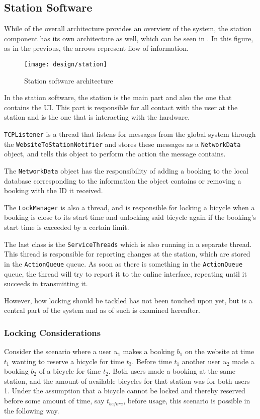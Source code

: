 \subsection{Station Software}\label{subsec:stationsoftdesfgi}
While  of the overall architecture provides an overview of the system, the station component has its own architecture as well, which can be seen in . In this figure, as in the previous, the arrows represent flow of information.

\begin{figure}[h]
	\centering
	\texttt{[image: design/station]}
	\caption{Station software architecture}\label{fig:stationarch}
\end{figure}

In the station software, the station is the main part and also the one that contains the UI. 
This part is responsible for all contact with the user at the station and is the one that is interacting with the hardware.

\texttt{TCPListener} is a thread that listens for messages from the global system through the \texttt{Website\-ToStationNotifier} and stores these messages as a \texttt{NetworkData} object, and tells this object to perform the action the message contains.

The \texttt{NetworkData} object has the responsibility of adding a booking to the local database corresponding to the information the object contains or removing a booking with the ID it received.

The \texttt{LockManager} is also a thread, and is responsible for locking a bicycle when a booking is close to its start time and unlocking said bicycle again if the booking's start time is exceeded by a certain limit.

The last class is the \texttt{ServiceThreads} which is also running in a separate thread.
This thread is responsible for reporting changes at the station, which are stored in the \texttt{ActionQueue} queue.
As soon as there is something in the \texttt{ActionQueue} queue, the thread will try to report it to the online interface, repeating until it succeeds in transmitting it.

However, how locking should be tackled has not been touched upon yet, but is a  central part of the system and as of such is examined hereafter.

\subsubsection{Locking Considerations}\label{subsec:lockingcons}
Consider the scenario where a user $u_1$ makes a booking $b_1$ on the website at time $t_1$ wanting to reserve a bicycle for time $t_3$. Before time $t_1$ another user $u_2$ made a booking $b_2$ of a bicycle for time $t_2$. Both users made a booking at the same station, and the amount of available bicycles for that station was for both users 1. Under the assumption that a bicycle cannot be locked and thereby reserved before some amount of time, say $t_{before}$, before usage, this scenario is possible in the following way.

